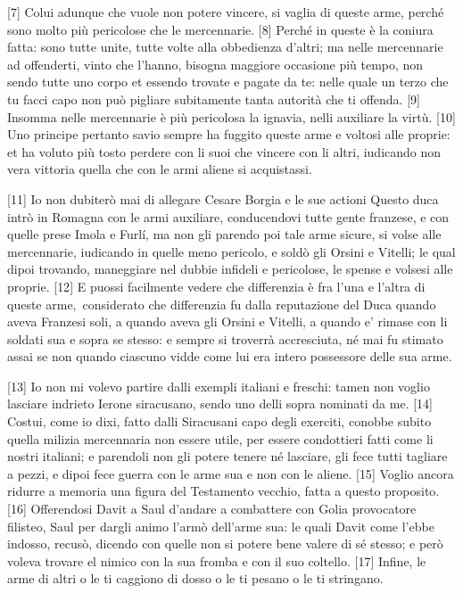 {[}7{]} Colui adunque che vuole non potere vincere, si vaglia di queste
arme, perché sono molto più pericolose che le mercennarie. {[}8{]}
Perché in queste è la coniura fatta: sono tutte unite, tutte volte alla
obbedienza d'altri; ma nelle mercennarie ad offenderti, vinto che
l'hanno, bisogna maggiore occasione più tempo, non sendo tutte uno corpo
et essendo trovate e pagate da te: nelle quale un terzo che tu facci
capo non può pigliare subitamente tanta autorità che ti offenda. {[}9{]}
Insomma nelle mercennarie è più pericolosa la ignavia, nelli auxiliare
la virtù. {[}10{]} Uno principe pertanto savio sempre ha fuggito queste
arme e voltosi alle proprie: et ha voluto più tosto perdere con li suoi
che vincere con li altri, iudicando non vera vittoria quella che con le
armi aliene si acquistassi.

{[}11{]} Io non dubiterò mai di allegare Cesare Borgia e le sue actioni
Questo duca intrò in Romagna con le armi auxiliare, conducendovi tutte
gente franzese, e con quelle prese Imola e Furlí, ma non gli parendo poi
tale arme sicure, si volse alle mercennarie, iudicando in quelle meno
pericolo, e soldò gli Orsini e Vitelli; le qual dipoi trovando,
maneggiare nel dubbie infideli e pericolose, le spense e volsesi alle
proprie. {[}12{]} E puossi facilmente vedere che differenzia è fra l'una
e l'altra di queste arme,\est\ considerato che differenzia fu dalla
reputazione del Duca quando aveva Franzesi soli, a quando aveva gli
Orsini e Vitelli, a quando e' rimase con li soldati sua e sopra se
stesso: e sempre si troverrà accresciuta, né mai fu stimato assai se non
quando ciascuno vidde come lui era intero possessore delle sua arme.

{[}13{]} Io non mi volevo partire dalli exempli italiani e freschi:
tamen non voglio lasciare indrieto Ierone siracusano, sendo uno delli
sopra nominati da me. {[}14{]} Costui, come io dixi, fatto dalli
Siracusani capo degli exerciti, conobbe subito quella milizia
mercennaria non essere utile, per essere condottieri fatti come li
nostri italiani; e parendoli non gli potere tenere né lasciare, gli fece
tutti tagliare a pezzi, e dipoi fece guerra con le arme sua e non con le
aliene. {[}15{]} Voglio ancora ridurre a memoria una figura del
Testamento vecchio, fatta a questo proposito. {[}16{]} Offerendosi Davit
a Saul d'andare a combattere con Golia provocatore filisteo, Saul per
dargli animo l'armò dell'arme sua: le quali Davit come l'ebbe indosso,
recusò, dicendo con quelle non si potere bene valere di sé stesso; e
però voleva trovare el nimico con la sua fromba e con il suo coltello.
{[}17{]} Infine, le arme di altri o le ti caggiono di dosso o le ti
pesano o le ti stringano.

